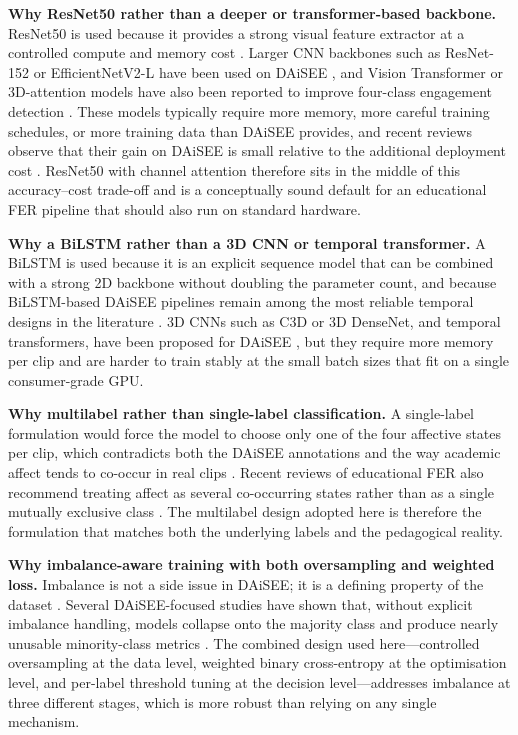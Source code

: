 \textbf{Why ResNet50 rather than a deeper or transformer-based backbone.} ResNet50 is used because it provides a strong visual feature extractor at a controlled compute and memory cost \cite{he_resnet_2016}. Larger CNN backbones such as ResNet-152 or EfficientNetV2-L have been used on DAiSEE \cite{asaju_adaptive_2022,shiri_detection_2024}, and Vision Transformer or 3D-attention models have also been reported to improve four-class engagement detection \cite{mehta_three-dimensional_2022,su_leveraging_2024,liu_dynamic_nodate}. These models typically require more memory, more careful training schedules, or more training data than DAiSEE provides, and recent reviews observe that their gain on DAiSEE is small relative to the additional deployment cost \cite{lek_academic_2023,vistorte_integrating_2024}. ResNet50 with channel attention therefore sits in the middle of this accuracy--cost trade-off and is a conceptually sound default for an educational FER pipeline that should also run on standard hardware.

\textbf{Why a BiLSTM rather than a 3D CNN or temporal transformer.} A BiLSTM is used because it is an explicit sequence model that can be combined with a strong 2D backbone without doubling the parameter count, and because BiLSTM-based DAiSEE pipelines remain among the most reliable temporal designs in the literature \cite{asaju_adaptive_2022,asaju_affects_2021,tulsani_realtime_2025,shiri_detection_2024}. 3D CNNs such as C3D or 3D DenseNet, and temporal transformers, have been proposed for DAiSEE \cite{gupta_daisee_2016,mehta_three-dimensional_2022,su_leveraging_2024,liu_dynamic_nodate}, but they require more memory per clip and are harder to train stably at the small batch sizes that fit on a single consumer-grade GPU.

\textbf{Why multilabel rather than single-label classification.} A single-label formulation would force the model to choose only one of the four affective states per clip, which contradicts both the DAiSEE annotations and the way academic affect tends to co-occur in real clips \cite{gupta_daisee_2016,dmello_language_2012}. Recent reviews of educational FER also recommend treating affect as several co-occurring states rather than as a single mutually exclusive class \cite{lek_academic_2023,florestiyanto_emotion_2024}. The multilabel design adopted here is therefore the formulation that matches both the underlying labels and the pedagogical reality.

\textbf{Why imbalance-aware training with both oversampling and weighted loss.} Imbalance is not a side issue in DAiSEE; it is a defining property of the dataset \cite{gupta_daisee_2016,abedi_improving_2021}. Several DAiSEE-focused studies have shown that, without explicit imbalance handling, models collapse onto the majority class and produce nearly unusable minority-class metrics \cite{santoni_convolutional_2023,rianto_engagement_2025}. The combined design used here---controlled oversampling at the data level, weighted binary cross-entropy at the optimisation level, and per-label threshold tuning at the decision level---addresses imbalance at three different stages, which is more robust than relying on any single mechanism.

